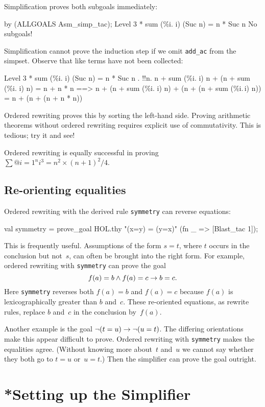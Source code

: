 Simplification proves both subgoals immediately:
\begin{ttbox}
by (ALLGOALS Asm_simp_tac);
{\out Level 3}
{ * sum (\%i. i) (Suc n) = n * Suc n}
{\out No subgoals!}
\end{ttbox}
Simplification cannot prove the induction step if we omit \texttt{add_ac} from
the simpset.  Observe that like terms have not been collected:
\begin{ttbox}
{\out Level 3}
{ * sum (\%i. i) (Suc n) = n * Suc n}
{. !!n. n + sum (\%i. i) n + (n + sum (\%i. i) n) = n + n * n}
{\out           ==> n + (n + sum (\%i. i) n) + (n + (n + sum (\%i.\,i) n)) =}
{\out               n + (n + (n + n * n))}
\end{ttbox}
Ordered rewriting proves this by sorting the left-hand side.  Proving
arithmetic theorems without ordered rewriting requires explicit use of
commutativity.  This is tedious; try it and see!

Ordered rewriting is equally successful in proving
$\sum@{i=1}^n i^3 = n^2\times(n+1)^2/4$.


\subsection{Re-orienting equalities}
Ordered rewriting with the derived rule \texttt{symmetry} can reverse
equations:
\begin{ttbox}
val symmetry = prove_goal HOL.thy "(x=y) = (y=x)"
                 (fn _ => [Blast_tac 1]);
\end{ttbox}
This is frequently useful.  Assumptions of the form $s=t$, where $t$ occurs
in the conclusion but not~$s$, can often be brought into the right form.
For example, ordered rewriting with \texttt{symmetry} can prove the goal
\[ f(a)=b \wedge f(a)=c \rightarrow b=c. \]
Here \texttt{symmetry} reverses both $f(a)=b$ and $f(a)=c$
because $f(a)$ is lexicographically greater than $b$ and~$c$.  These
re-oriented equations, as rewrite rules, replace $b$ and~$c$ in the
conclusion by~$f(a)$. 

Another example is the goal $\neg(t=u) \rightarrow \neg(u=t)$.
The differing orientations make this appear difficult to prove.  Ordered
rewriting with \texttt{symmetry} makes the equalities agree.  (Without
knowing more about~$t$ and~$u$ we cannot say whether they both go to $t=u$
or~$u=t$.)  Then the simplifier can prove the goal outright.



\section{*Setting up the Simplifier}\label{sec:setting-up-simp}

